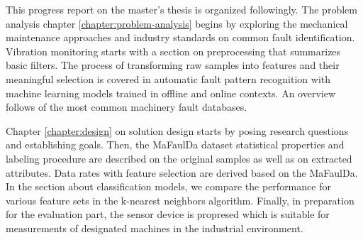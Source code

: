 This progress report on the master's thesis  is organized followingly. The problem analysis chapter \ref{chapter:problem-analysis} begins by exploring the mechanical maintenance approaches and industry standards on common fault identification. Vibration monitoring starts with a section on preprocessing that summarizes basic filters. The process of transforming raw samples into features and their meaningful selection is covered in automatic fault pattern recognition with machine learning models trained in offline and online contexts. An overview follows of the most common machinery fault databases. 

Chapter \ref{chapter:design} on solution design starts by posing research questions and establishing goals. Then, the MaFaulDa dataset statistical properties and labeling procedure are described on the original samples as well as on extracted attributes. Data rates with feature selection are derived based on the MaFaulDa. In the section about classification models, we compare the performance for various feature sets in the k-nearest neighbors algorithm. Finally, in preparation for the evaluation part, the sensor device is propresed which is suitable for measurements of designated machines in the industrial environment.
